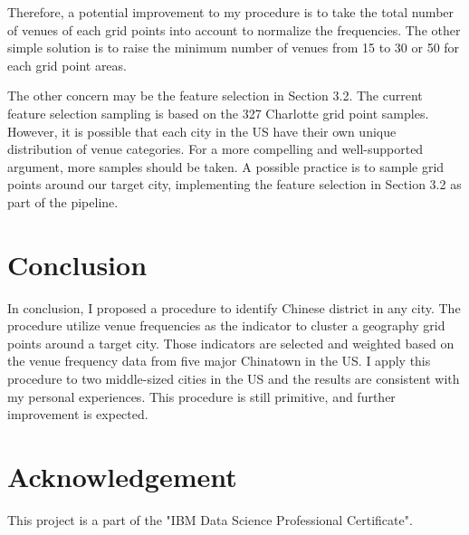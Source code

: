 \documentclass{article}
\begin{document}
Therefore, a potential improvement to my procedure is to take the total number of venues of each grid points into account to normalize the frequencies.
The other simple solution is to raise the minimum number of venues from 15 to 30 or 50 for each grid point areas.

The other concern may be the feature selection in Section 3.2.
The current feature selection sampling is based on the 327 Charlotte grid point samples.
However, it is possible that each city in the US have their own unique distribution of venue categories.
For a more compelling and well-supported argument, more samples should be taken.
A possible practice is to sample grid points around our target city, implementing the feature selection in Section 3.2 as part of the pipeline.

\section{Conclusion}
In conclusion, I proposed a procedure to identify Chinese district in any city.
The procedure utilize venue frequencies as the indicator to cluster a geography grid points around a target city.
Those indicators are selected and weighted based on the venue frequency data from five major Chinatown in the US.
I apply this procedure to two middle-sized cities in the US and the results are consistent with my personal experiences.
This procedure is still primitive, and further improvement is expected.

\section{Acknowledgement}
This project is a part of the "IBM Data Science Professional Certificate".

\newpage



\end{document}
